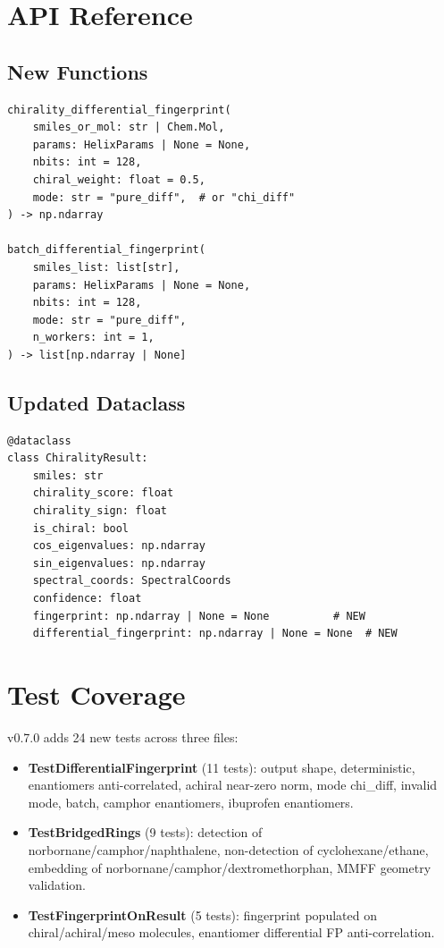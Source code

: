 \documentclass[11pt,a4paper]{article}
\begin{document}
\section{API Reference}

\subsection{New Functions}

\begin{verbatim}
chirality_differential_fingerprint(
    smiles_or_mol: str | Chem.Mol,
    params: HelixParams | None = None,
    nbits: int = 128,
    chiral_weight: float = 0.5,
    mode: str = "pure_diff",  # or "chi_diff"
) -> np.ndarray

batch_differential_fingerprint(
    smiles_list: list[str],
    params: HelixParams | None = None,
    nbits: int = 128,
    mode: str = "pure_diff",
    n_workers: int = 1,
) -> list[np.ndarray | None]
\end{verbatim}

\subsection{Updated Dataclass}

\begin{verbatim}
@dataclass
class ChiralityResult:
    smiles: str
    chirality_score: float
    chirality_sign: float
    is_chiral: bool
    cos_eigenvalues: np.ndarray
    sin_eigenvalues: np.ndarray
    spectral_coords: SpectralCoords
    confidence: float
    fingerprint: np.ndarray | None = None          # NEW
    differential_fingerprint: np.ndarray | None = None  # NEW
\end{verbatim}

\section{Test Coverage}

v0.7.0 adds 24 new tests across three files:

\begin{itemize}[leftmargin=*]
    \item \textbf{TestDifferentialFingerprint} (11 tests): output shape, deterministic, enantiomers anti-correlated, achiral near-zero norm, mode chi\_diff, invalid mode, batch, camphor enantiomers, ibuprofen enantiomers.
    \item \textbf{TestBridgedRings} (9 tests): detection of norbornane/camphor/naphthalene, non-detection of cyclohexane/ethane, embedding of norbornane/camphor/dextromethorphan, MMFF geometry validation.
    \item \textbf{TestFingerprintOnResult} (5 tests): fingerprint populated on chiral/achiral/meso molecules, enantiomer differential FP anti-correlation.
\end{itemize}
\end{document}

